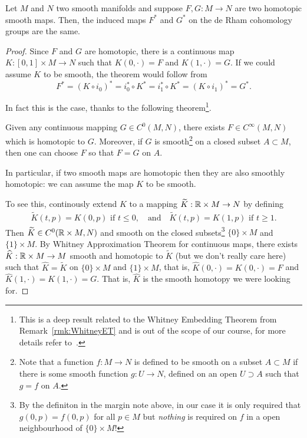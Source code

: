 \begin{theorem}
Let $M$ and $N$ two smooth manifolds and suppose $F,G: M\to N$ are two homotopic smooth maps.
Then, the induced maps $F^*$ and $G^*$ on the de Rham cohomology groups are the same.
\end{theorem}
\begin{proof}
Since $F$ and $G$ are homotopic, there is a continuous map $K: [0,1]\times M \to N$ such that $K(0,\cdot) = F$ and $K(1,\cdot) = G$.
If we could assume $K$ to be smooth, the theorem would follow from
\begin{equation}
  F^* = (K\circ i_0)^* = i_0^*\circ K^* = i_1^*\circ K^* = (K\circ i_1)^* = G^*.
\end{equation}

In fact this is the case, thanks to the following theorem\footnote{This is a deep result related to the Whitney Embedding Theorem from Remark~\ref{rmk:WhitneyET} and is out of the scope of our course, for more details refer to~\cite[Chapter 6 and Theorems 6.26 and 9.27]{book:lee}.}.
%
\begin{theorem}\label{thm:WhitneyApproxCont}
Given any continuous mapping $G \in C^0(M,N)$, there exists $F \in C^\infty(M,N)$ which is homotopic to $G$. Moreover, if $G$ is smooth\footnote{Note that a function $f : M \to N$ is defined to be smooth on a subset $A \subset M$ if there is some smooth function $g: U \to N$, defined on an open $U\supset A$ such that $g = f$ on $A$.} on a closed subset $A\subset M$, then one can choose $F$ so that $F=G$ on $A$.
\end{theorem}
%
In particular, if two smooth maps are homotopic then they are also smoothly homotopic: we can assume the map $K$ to be smooth.

To see this, continously extend $K$ to a mapping $\widetilde K : \mathbb{R} \times M \to N$ by defining
\begin{align}
  \widetilde K(t, p) = K(0, p) \mbox{ if } t \leq 0,
  \quad\mbox{and}\quad \widetilde K(t, p) = K(1, p) \mbox{ if } t \geq 1.
\end{align}
Then $\widetilde K \in C^0(\mathbb{R}\times M, N)$ and smooth on the closed subsets\footnote{By the definiton in the margin note above, in our case it is only required that $g(0, p) = f(0,p)$ for all $p\in M$ but \emph{nothing} is required on $f$ in a open neighbourhood of $\{0\}\times M$!} $\{0\}\times M$ and $\{1\}\times M$.
%
By Whitney Approximation Theorem for continuous maps, there exists $\widehat K : \mathbb{R}\times M \to M$ smooth and homotopic to $\widetilde K$ (but we don't really care here) such that $\widehat K = \widetilde K$ on $\{0\}\times M$ and $\{1\}\times M$, that is, $\widehat K(0, \cdot) = K(0, \cdot) = F$ and $\widehat K(1, \cdot) = K(1, \cdot) = G$.
That is, $\hat K$ is the smooth homotopy we were looking for.
\end{proof}

